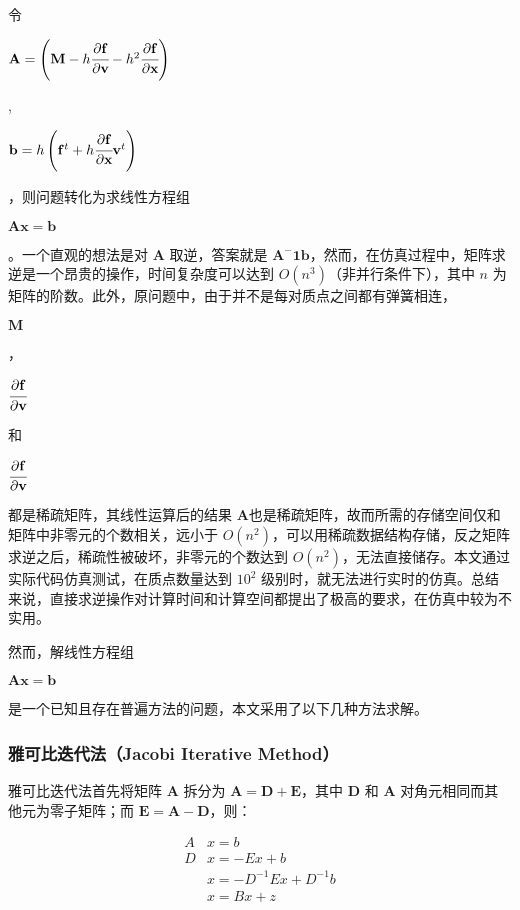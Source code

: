 \documentclass[UTF8]{ctexart}
\begin{document}
令 \begin{large}$ \mathbf{A} = \left ( \mathbf{M} - h \cfrac{\partial \mathbf{f}}{\partial \mathbf{v}} - h^2 \cfrac{\partial \mathbf{f}}{\partial \mathbf{x}} \right ) $\end{large}, \begin{large} $\mathbf{b} = h \left ( \mathbf{f}^{t} + h \cfrac{\partial \mathbf{f}}{\partial \mathbf{x}} \mathbf{v}^t \right )$ \end{large}，则问题转化为求线性方程组 \begin{large} $\mathbf{Ax = b}$ \end{large}。一个直观的想法是对 $\mathbf{A}$ 取逆，答案就是 $\mathbf{A^-1b}$，然而，在仿真过程中，矩阵求逆是一个昂贵的操作，时间复杂度可以达到 $O(n^3)$（非并行条件下），其中 $n$ 为矩阵的阶数。此外，原问题中，由于并不是每对质点之间都有弹簧相连，\begin{large} $ \mathbf{M} $ \end{large}，\begin{large} $\cfrac{\partial \mathbf{f}}{\partial \mathbf{v}}$ \end{large} 和 \begin{large} $\cfrac{\partial \mathbf{f}}{\partial \mathbf{v}}$ \end{large} 都是稀疏矩阵，其线性运算后的结果 $\mathbf{A}$也是稀疏矩阵，故而所需的存储空间仅和矩阵中非零元的个数相关，远小于 $O(n^2)$，可以用稀疏数据结构存储，反之矩阵求逆之后，稀疏性被破坏，非零元的个数达到 $O(n^2)$，无法直接储存。本文通过实际代码仿真测试，在质点数量达到 $10^2$ 级别时，就无法进行实时的仿真。总结来说，直接求逆操作对计算时间和计算空间都提出了极高的要求，在仿真中较为不实用。 \par

然而，解线性方程组 \begin{large} $\mathbf{Ax = b}$ \end{large} 是一个已知且存在普遍方法的问题，本文采用了以下几种方法求解。

\subsubsection {雅可比迭代法（Jacobi Iterative Method）}

雅可比迭代法首先将矩阵 $\mathbf{A}$ 拆分为 $\mathbf{A=D+E}$，其中 $\mathbf{D}$ 和 $\mathbf{A}$ 对角元相同而其他元为零子矩阵；而 $\mathbf{E=A-D}$，则：

\begin{large}
\begin{equation}
\begin{split}
A&x = b \\
D&x = -Ex + b \\
&x = -D^{-1} E x + D^{-1}b \\
&x = Bx + z
\end{split}
\end{equation}
\end{large}
\end{document}

